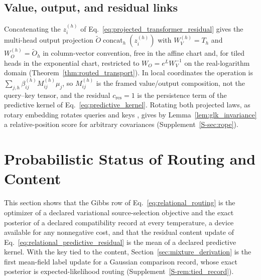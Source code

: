 \documentclass[twoside,11pt]{article}
\begin{document}
\subsection{Value, output, and residual links}
\label{sec:value_aggregation}

Concatenating the $z_i^{(h)}$ of Eq.~\eqref{eq:projected_transformer_residual} gives the multi-head output projection $\widetilde O\operatorname{concat}_h(z_i^{(h)})$ \citep[Sec.~3.2.2]{vaswani2017attention} with $W_V^{(h)}=T_h$ and $W_O^{(h)}=\widetilde O_h$ in column-vector convention, free in the affine chart and, for tiled heads in the exponential chart, restricted to $W_O=e^{L}W_V^{-1}$ on the real-logarithm domain (Theorem~\ref{thm:routed_transport}). In local coordinates the operation is $\sum_{j,h}\beta_{ij}^{(h)}M_{ij}^{(h)}\mu_j$, so $M_{ij}^{(h)}$ is the framed value/output composition, not the query--key tensor, and the residual $c_{\mathrm{res}}=1$ is the persistence term of the predictive kernel of Eq.~\eqref{eq:predictive_kernel}. Rotating both projected laws, as rotary embedding rotates queries and keys \citep{su2024roformer}, gives by Lemma~\ref{lem:glk_invariance} a relative-position score for arbitrary covariances (Supplement~\ref{S-sec:rope}).



\section{Probabilistic Status of Routing and Content}
\label{sec:probabilistic_status}

This section shows that the Gibbs row of Eq.~\eqref{eq:relational_routing} is the optimizer of a declared variational source-selection objective and the exact posterior of a declared compatibility record at every temperature, a device available for any nonnegative cost, and that the residual content update of Eq.~\eqref{eq:relational_predictive_residual} is the mean of a declared predictive kernel. With the key tied to the content, Section~\ref{sec:mixture_derivation} is the first mean-field label update for a Gaussian comparison record, whose exact posterior is expected-likelihood routing (Supplement~\ref{S-rem:tied_record}).
\end{document}
